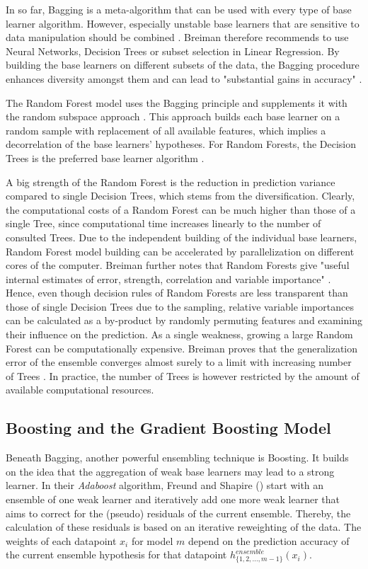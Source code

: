 \documentclass[12pt]{article}
\begin{document}
In so far, Bagging is a meta-algorithm that can be used with every type of base learner algorithm. However, especially unstable base learners that are sensitive to data manipulation should be combined \citep[p.124]{breiman1996bagging}. Breiman therefore recommends to use Neural Networks, Decision Trees	or subset selection in Linear Regression. By building the base learners on different subsets of the data, the Bagging procedure enhances diversity amongst them and can lead to "substantial gains in accuracy" \citep[p.123]{breiman1996bagging}.

The Random Forest model uses the Bagging principle and supplements it with the random subspace approach \citep{ho1998random, breiman2001random}. This approach builds each base learner on a random sample with replacement of all available features, which implies a decorrelation of the base learners' hypotheses. For Random Forests, the Decision Trees is the preferred base learner algorithm \citep[cp.][]{breiman2001random}.

A big strength of the Random Forest is the reduction in prediction variance compared to single Decision Trees, which stems from the diversification. Clearly, the computational costs of a Random Forest can be much higher than those of a single Tree, since computational time increases linearly to the number of consulted Trees. Due to the independent building of the individual base learners, Random Forest model building can be accelerated by parallelization on different cores of the computer. Breiman further notes that Random Forests give "useful internal estimates of error, strength, correlation and variable importance" \citep[p.10]{breiman2001random}. Hence, even though decision rules of Random Forests are less transparent than those of single Decision Trees due to the sampling, relative variable importances can be calculated as a by-product by randomly permuting features and examining their influence on the prediction. As a single weakness, growing a large Random Forest can be computationally expensive. Breiman proves that the generalization error of the ensemble converges almost surely to a limit with increasing number of Trees \citep[p.30]{breiman2001random}. In practice, the number of Trees is however restricted by the amount of available computational resources.



\subsection{Boosting and the Gradient Boosting Model}
Beneath Bagging, another powerful ensembling technique is Boosting. It builds on the idea that the aggregation of weak base learners may lead to a strong learner. In their \textit{Adaboost} algorithm, Freund and Shapire (\citeyear{freund1996experiments}) start with an ensemble of one weak learner and iteratively add one more weak learner that aims to correct for the (pseudo) residuals of the current ensemble. Thereby, the calculation of these residuals is based on an iterative reweighting of the data. The weights of each datapoint $x_{i}$ for model $m$ depend on the prediction accuracy of the current ensemble hypothesis for that datapoint $h^{ensemble}_{\{1,2,...,m-1\}}(x_{i})$. 
\end{document}
